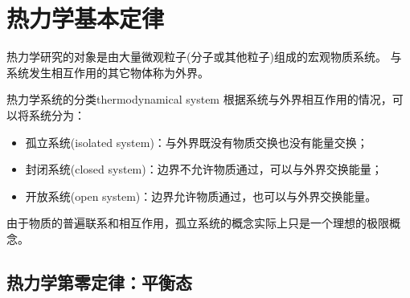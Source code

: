 \chapter{热力学基本定律}


热力学研究的对象是由大量微观粒子(分子或其他粒子)组成的宏观物质系统。
与系统发生相互作用的其它物体称为外界。

\begin{definition}
	{热力学系统的分类}{thermodynamical system}
	根据系统与外界相互作用的情况，可以将系统分为：
	\begin{itemize}
		\item 孤立系统(isolated system)：与外界既没有物质交换也没有能量交换；
		\item 封闭系统(closed system)：边界不允许物质通过，可以与外界交换能量；
		\item 开放系统(open system)：边界允许物质通过，也可以与外界交换能量。
	\end{itemize}
\end{definition}

\begin{remark}
	由于物质的普遍联系和相互作用，孤立系统的概念实际上只是一个理想的极限概念。
\end{remark}


\section{热力学第零定律：平衡态}

